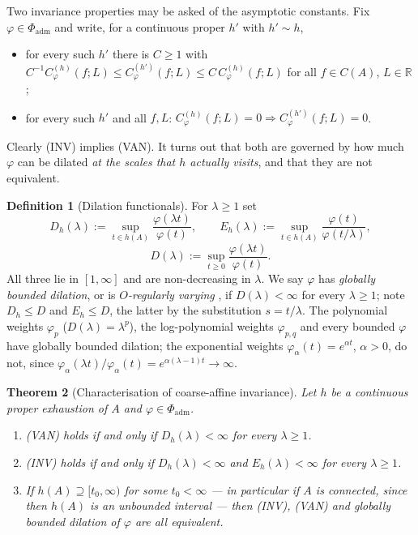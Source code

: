 \documentclass[11pt,a4paper]{article}
\numberwithin{equation}{section}
\theoremstyle{plain}
\newtheorem{theorem}{Theorem}[section]
\theoremstyle{definition}
\newtheorem{definition}[theorem]{Definition}
\theoremstyle{remark}
\newcommand{\R}{\mathbb{R}}
\begin{document}
Two invariance properties may be asked of the asymptotic constants. Fix
$\varphi\in\Phi_{\mathrm{adm}}$ and write, for a continuous proper $h'$ with $h'\sim h$,
\begin{itemize}
\item[(INV)] for every such $h'$ there is $C\ge1$ with
$C^{-1}C^{(h)}_\varphi(f;L)\le C^{(h')}_\varphi(f;L)\le C\,C^{(h)}_\varphi(f;L)$ for all
$f\in C(A)$, $L\in\R$;
\item[(VAN)] for every such $h'$ and all $f,L$:
$C^{(h)}_\varphi(f;L)=0\Rightarrow C^{(h')}_\varphi(f;L)=0$.
\end{itemize}
Clearly (INV) implies (VAN). It turns out that both are governed by how much $\varphi$ can
be dilated \emph{at the scales that $h$ actually visits}, and that they are not equivalent.

\begin{definition}[Dilation functionals]\label{def:bounded-dilation}
For $\lambda\ge1$ set
\[
D_h(\lambda):=\sup_{t\in h(A)}\frac{\varphi(\lambda t)}{\varphi(t)},
\qquad
E_h(\lambda):=\sup_{t\in h(A)}\frac{\varphi(t)}{\varphi(t/\lambda)},
\]
\[
D(\lambda):=\sup_{t\ge0}\frac{\varphi(\lambda t)}{\varphi(t)} .
\]
All three lie in $[1,\infty]$ and are non-decreasing in $\lambda$. We say $\varphi$ has
\emph{globally bounded dilation}, or is \emph{$O$-regularly varying}
\cite{BinghamGoldieTeugels1987}, if $D(\lambda)<\infty$ for every $\lambda\ge1$; note
$D_h\le D$ and $E_h\le D$, the latter by the substitution $s=t/\lambda$. The polynomial
weights $\varphi_p$ ($D(\lambda)=\lambda^{p}$), the log-polynomial weights
$\varphi_{p,q}$ and every bounded $\varphi$ have globally bounded dilation; the
exponential weights $\varphi_\alpha(t)=e^{\alpha t}$, $\alpha>0$, do not, since
$\varphi_\alpha(\lambda t)/\varphi_\alpha(t)=e^{\alpha(\lambda-1)t}\to\infty$.
\end{definition}

\begin{theorem}[Characterisation of coarse-affine invariance]\label{thm:coarse-stability}
Let $h$ be a continuous proper exhaustion of $A$ and $\varphi\in\Phi_{\mathrm{adm}}$.
\begin{enumerate}
\item[(a)] \textup{(VAN)} holds if and only if $D_h(\lambda)<\infty$ for every $\lambda\ge1$.
\item[(b)] \textup{(INV)} holds if and only if $D_h(\lambda)<\infty$ and
$E_h(\lambda)<\infty$ for every $\lambda\ge1$.
\item[(c)] If $h(A)\supseteq[t_0,\infty)$ for some $t_0<\infty$ --- in particular if $A$ is
connected, since then $h(A)$ is an unbounded interval --- then \textup{(INV)},
\textup{(VAN)} and globally bounded dilation of $\varphi$ are all equivalent.
\end{enumerate}
\end{theorem}
\end{document}
